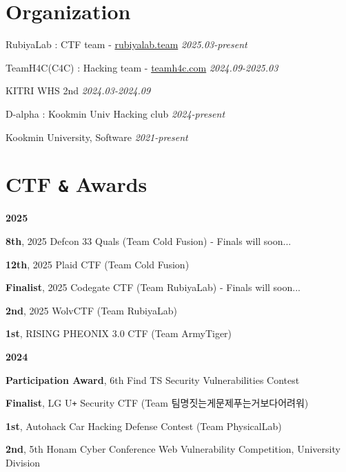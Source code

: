 \documentclass[margin,line]{resume}
\begin{document}
\begin{resume}
 	

 	    \section{\mysidestyle Organization}%
 	      \begin{list2}
 	      \item{RubiyaLab : CTF team - \href{https://rubiyalab.team}{rubiyalab.team} \hfill \textsl{2025.03-present}}
            \item{TeamH4C(C4C) : Hacking team - \href{https://teamh4c.com}{teamh4c.com} \hfill \textsl{2024.09-2025.03}}
 	      \item{KITRI WHS 2nd  \hfill \textsl{2024.03-2024.09}}
            \item{D-alpha : Kookmin Univ Hacking club  \hfill \textsl{2024-present}}
 	      \item{Kookmin University, Software  \hfill \textsl{2021-present}}
 	      
 	      \end{list2}


        \section{\mysidestyle CTF \texttt{\&} Awards}
      
        \textbf{2025}
        \vspace{1mm}
        \begin{list2}
          \item \textbf{8th}, 2025 Defcon 33 Quals (Team Cold Fusion) - Finals will soon...
          \item \textbf{12th}, 2025 Plaid CTF (Team Cold Fusion)
          \item \textbf{Finalist}, 2025 Codegate CTF (Team RubiyaLab) - Finals will soon...
          \item \textbf{2nd}, 2025 WolvCTF (Team RubiyaLab)
          \item \textbf{1st}, RISING PHEONIX 3.0 CTF (Team ArmyTiger)
        \end{list2}
        
        \textbf{2024}
        \vspace{1mm}
        \begin{list2}
          \item \textbf{Participation Award}, 6th Find TS Security Vulnerabilities Contest
          \item \textbf{Finalist}, LG U\texttt{+} Security CTF (Team 팀명짓는게문제푸는거보다어려워)
          \item \textbf{1st}, Autohack Car Hacking Defense Contest (Team PhysicalLab)
          \item \textbf{2nd}, 5th Honam Cyber Conference Web Vulnerability Competition, University Division
        \end{list2}


\end{resume}
\end{document}
